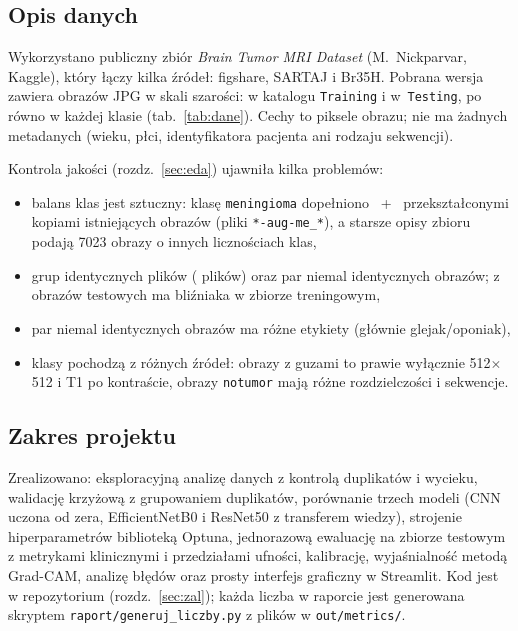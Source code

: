 \documentclass[11pt,a4paper]{article}
\newcommand{\tabela}[1]{}
\begin{document}
\subsection*{Opis danych}
Wykorzystano publiczny zbiór \emph{Brain Tumor MRI Dataset} (M.~Nickparvar, Kaggle), który
łączy kilka źródeł: figshare, SARTAJ i Br35H. Pobrana wersja zawiera \nAll{} obrazów JPG
w skali szarości: \nTrainDir{} w katalogu \texttt{Training} i \nTestDir{} w~\texttt{Testing},
po równo w każdej klasie (tab.~\ref{tab:dane}). Cechy to piksele obrazu; nie ma żadnych
metadanych (wieku, płci, identyfikatora pacjenta ani rodzaju sekwencji).

Kontrola jakości (rozdz.~\ref{sec:eda}) ujawniła kilka problemów:
\begin{itemize}
\item balans klas jest sztuczny: klasę \texttt{meningioma} dopełniono \nAugTrain{}~+~\nAugTest{}
  przekształconymi kopiami istniejących obrazów (pliki \texttt{*-aug-me\_*}), a starsze opisy
  zbioru podają 7023 obrazy o innych licznościach klas,
\item \nMdGroups{} grup identycznych plików (\nMdFiles{} plików) oraz \nPairs{} par niemal identycznych
  obrazów; \leakFour{} z \nTestDir{} obrazów testowych ma bliźniaka w zbiorze treningowym,
\item \nPairsConflict{} par niemal identycznych obrazów ma różne etykiety (głównie glejak/oponiak),
\item klasy pochodzą z różnych źródeł: obrazy z guzami to prawie wyłącznie 512$\times$512 i T1 po
  kontraście, obrazy \texttt{notumor} mają różne rozdzielczości i sekwencje.
\end{itemize}

\begin{table}[H]
\centering
\caption{Liczność klas. ,,aug'' -- sztuczne kopie; ,,trening'' -- zbiór używany do uczenia
(bez kopii); \texttt{test\_dedup} -- test oczyszczony z duplikatów treningu (rozdz.~\ref{sec:dup}).}
\label{tab:dane}
\tabela{dane}
\end{table}

\subsection*{Zakres projektu}
Zrealizowano: eksploracyjną analizę danych z kontrolą duplikatów i wycieku, walidację
krzyżową z grupowaniem duplikatów, porównanie trzech modeli (CNN uczona od zera,
EfficientNetB0 i ResNet50 z transferem wiedzy), strojenie hiperparametrów biblioteką Optuna,
jednorazową ewaluację na zbiorze testowym z metrykami klinicznymi i przedziałami ufności,
kalibrację, wyjaśnialność metodą Grad-CAM, analizę błędów oraz prosty interfejs graficzny
w Streamlit. Kod jest w repozytorium (rozdz.~\ref{sec:zal}); każda liczba w raporcie jest
generowana skryptem \texttt{raport/generuj\_liczby.py} z plików w \texttt{out/metrics/}.
\end{document}
